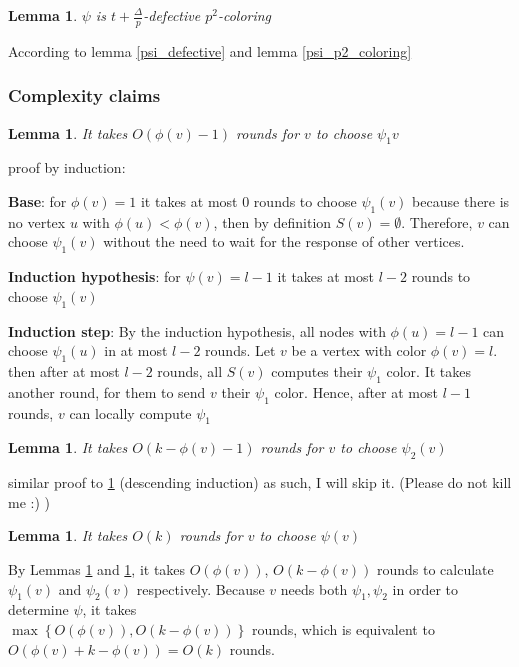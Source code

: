 \documentclass[11pt]{article}
\newtheorem{lemma}[theorem]{Lemma}
\begin{document}
\begin{lemma}
$\psi$ is $t+\frac{\Delta}{p}$-defective $p^2$-coloring
\end{lemma}
According to lemma \ref{psi_defective} and lemma \ref{psi_p2_coloring}


\subsubsection*{Complexity claims}

\begin{lemma}
\label{psi_1_rounds}
It takes $O(\phi(v) -1)$ rounds for $v$ to choose $\psi_1{v}$
\end{lemma}
proof by induction: 

\textbf{Base}: for $\phi(v)=1$ it takes at most 0 rounds to choose $\psi_1(v)$
because there is no vertex $u$ with $\phi(u) < \phi(v)$, then by definition $S(v)=\emptyset$. Therefore, $v$ can choose $\psi_1(v)$ without the need to wait for the response of other vertices.

\textbf{Induction hypothesis}: for $\psi(v)=l-1$ it takes at most $l-2$ rounds to choose $\psi_1(v)$

\textbf{Induction step}: By the induction hypothesis, all nodes with $\phi(u)=l-1$ can choose $\psi_1(u)$ in at most $l-2$ rounds. Let $v$ be a vertex with color $\phi(v)=l$. then after at most $l-2$ rounds, all $S(v)$ computes their $\psi_1$ color. It takes another round, for them to send $v$ their $\psi_1$ color. Hence, after at most $l-1$ rounds, $v$ can locally compute $\psi_1$

\begin{lemma}
\label{psi_2_rounds}
It takes $O(k -\phi(v) -1 )$ rounds for $v$ to choose $\psi_2(v)$
\end{lemma}
similar proof to \ref{psi_1_rounds} (descending induction) as such, I will skip it. (Please do not kill me :) )

\begin{lemma}
\label{psi_rounds}
It takes $O(k)$ rounds for $v$ to choose $\psi(v)$
\end{lemma}
By Lemmas \ref{psi_1_rounds} and \ref{psi_2_rounds}, it takes $O(\phi(v))$, $O(k- \phi(v))$  rounds to calculate $\psi_1(v)$ and $\psi_2(v)$ respectively. Because $v$ needs both $\psi_1, \psi_2$ in order to determine $\psi$, it takes \\
$\max \left\{ O(\phi(v)), O(k- \phi(v)) \right\}$
rounds, which is equivalent to $O(\phi(v) + k- \phi(v))=O(k)$ rounds.
\end{document}
